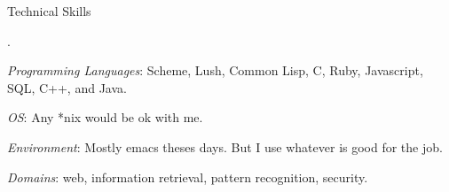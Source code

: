 \begin{rubric}{Technical Skills}{

  .

  
  \entry* \emph{Programming Languages}: Scheme, Lush, Common Lisp, C,
  Ruby, Javascript, SQL, C++, and Java.
  
  \entry* \emph{OS}: Any *nix would be ok with me.

  \entry* \emph{Environment}: Mostly emacs theses days. But I use
  whatever is good for the job.

  \entry* \emph{Domains}: web, information retrieval, pattern
  recognition, security.
  
}\end{rubric}
